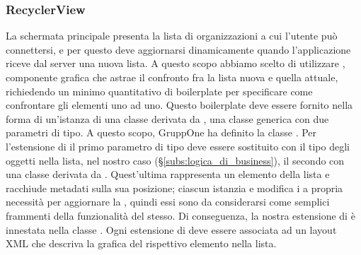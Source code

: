 \documentclass[../../manuale-sviluppatore.tex]{subfiles}
\begin{document}
\subsubsection{RecyclerView}%
\label{subs:recyclerview}
La schermata principale presenta la lista di organizzazioni a cui l'utente può connettersi, e per questo deve aggiornarsi dinamicamente quando l'applicazione riceve dal server una nuova lista.
A questo scopo abbiamo scelto di utilizzare , componente grafica che astrae il confronto fra la lista nuova e quella attuale, richiedendo un minimo quantitativo di boilerplate per specificare come confrontare gli elementi uno ad uno.
Questo boilerplate deve essere fornito nella forma di un'istanza di una classe derivata da , una classe generica con due parametri di tipo.
A questo scopo, GruppOne ha definito la classe .
Per l'estensione di  il primo parametro di tipo deve essere sostituito con il tipo degli oggetti nella lista, nel nostro caso  (§\ref{subs:logica_di_business}), il secondo con una classe derivata da .
Quest'ultima rappresenta un elemento della lista e racchiude metadati sulla sua posizione; ciascun  istanzia e modifica i  a propria necessità per aggiornare la , quindi essi sono da considerarsi come semplici frammenti della funzionalità del  stesso.
Di conseguenza, la nostra estensione di  è innestata nella classe . Ogni estensione di  deve essere associata ad un layout XML che descriva la grafica del rispettivo elemento nella lista.\par
\end{document}
